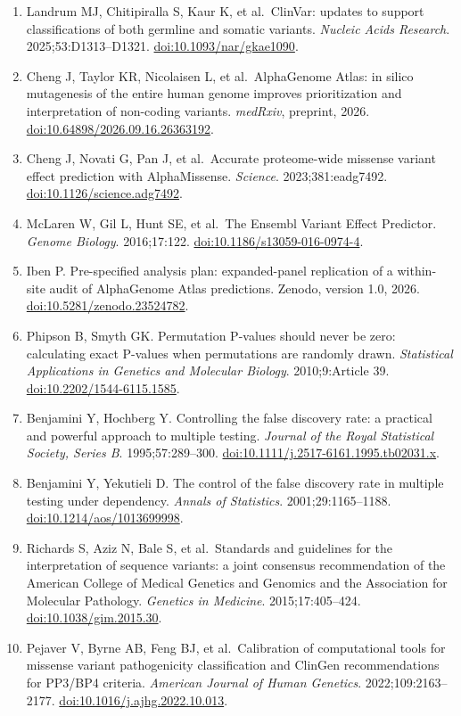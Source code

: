 \documentclass[
  11pt,
]{article}
\providecommand{\tightlist}{%
  \setlength{\itemsep}{0pt}\setlength{\parskip}{0pt}}
\begin{document}
\begin{enumerate}
\def\labelenumi{\arabic{enumi}.}
\tightlist
\item
  Landrum MJ, Chitipiralla S, Kaur K, et al.~ClinVar: updates to support
  classifications of both germline and somatic variants. \emph{Nucleic
  Acids Research}. 2025;53:D1313--D1321.
  \href{https://doi.org/10.1093/nar/gkae1090}{doi:10.1093/nar/gkae1090}.
\item
  Cheng J, Taylor KR, Nicolaisen L, et al.~AlphaGenome Atlas: in silico
  mutagenesis of the entire human genome improves prioritization and
  interpretation of non-coding variants. \emph{medRxiv}, preprint, 2026.
  \href{https://doi.org/10.64898/2026.09.16.26363192}{doi:10.64898/2026.09.16.26363192}.
\item
  Cheng J, Novati G, Pan J, et al.~Accurate proteome-wide missense
  variant effect prediction with AlphaMissense. \emph{Science}.
  2023;381:eadg7492.
  \href{https://doi.org/10.1126/science.adg7492}{doi:10.1126/science.adg7492}.
\item
  McLaren W, Gil L, Hunt SE, et al.~The Ensembl Variant Effect
  Predictor. \emph{Genome Biology}. 2016;17:122.
  \href{https://doi.org/10.1186/s13059-016-0974-4}{doi:10.1186/s13059-016-0974-4}.
\item
  Iben P. Pre-specified analysis plan: expanded-panel replication of a
  within-site audit of AlphaGenome Atlas predictions. Zenodo, version
  1.0, 2026.
  \href{https://doi.org/10.5281/zenodo.23524782}{doi:10.5281/zenodo.23524782}.
\item
  Phipson B, Smyth GK. Permutation P-values should never be zero:
  calculating exact P-values when permutations are randomly drawn.
  \emph{Statistical Applications in Genetics and Molecular Biology}.
  2010;9:Article 39.
  \href{https://doi.org/10.2202/1544-6115.1585}{doi:10.2202/1544-6115.1585}.
\item
  Benjamini Y, Hochberg Y. Controlling the false discovery rate: a
  practical and powerful approach to multiple testing. \emph{Journal of
  the Royal Statistical Society, Series B}. 1995;57:289--300.
  \href{https://doi.org/10.1111/j.2517-6161.1995.tb02031.x}{doi:10.1111/j.2517-6161.1995.tb02031.x}.
\item
  Benjamini Y, Yekutieli D. The control of the false discovery rate in
  multiple testing under dependency. \emph{Annals of Statistics}.
  2001;29:1165--1188.
  \href{https://doi.org/10.1214/aos/1013699998}{doi:10.1214/aos/1013699998}.
\item
  Richards S, Aziz N, Bale S, et al.~Standards and guidelines for the
  interpretation of sequence variants: a joint consensus recommendation
  of the American College of Medical Genetics and Genomics and the
  Association for Molecular Pathology. \emph{Genetics in Medicine}.
  2015;17:405--424.
  \href{https://doi.org/10.1038/gim.2015.30}{doi:10.1038/gim.2015.30}.
\item
  Pejaver V, Byrne AB, Feng BJ, et al.~Calibration of computational
  tools for missense variant pathogenicity classification and ClinGen
  recommendations for PP3/BP4 criteria. \emph{American Journal of Human
  Genetics}. 2022;109:2163--2177.
  \href{https://doi.org/10.1016/j.ajhg.2022.10.013}{doi:10.1016/j.ajhg.2022.10.013}.
\end{enumerate}
\end{document}
